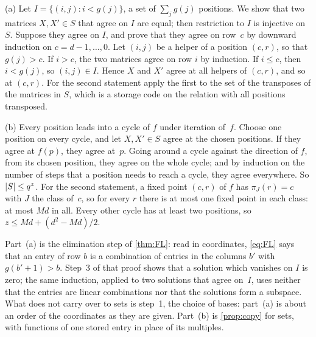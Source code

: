 \begin{informalproof}
(a) Let $I=\{(i,j):i<g(j)\}$, a set of $\sum_jg(j)$ positions. We show that two matrices $X,X'\in S$ that agree on
$I$ are equal; then restriction to $I$ is injective on $S$. Suppose they agree on $I$, and prove that they agree on
row~$c$ by downward induction on $c=d-1,\dots,0$. Let $(i,j)$ be a helper of a position $(c,r)$, so that $g(j)>c$. If
$i>c$, the two matrices agree on row $i$ by induction. If $i\le c$, then $i<g(j)$, so $(i,j)\in I$. Hence $X$ and $X'$
agree at all helpers of $(c,r)$, and so at $(c,r)$. For the second statement apply the first to the set of the
transposes of the matrices in $S$, which is a storage code on the relation with all positions transposed.

(b) Every position leads into a cycle of $f$ under iteration of~$f$. Choose one position on every cycle, and let
$X,X'\in S$ agree at the chosen positions. If they agree at $f(p)$, they agree at~$p$. Going around a cycle against
the direction of $f$, from its chosen position, they agree on the whole cycle; and by induction on the number of steps
that a position needs to reach a cycle, they agree everywhere. So $\lvert S \rvert\le q^z$. For the second statement, a fixed
point $(c,r)$ of $f$ has $\pi_J(r)=c$ with $J$ the class of~$c$, so for every $r$ there is at most one fixed point in
each class: at most $Md$ in all. Every other cycle has at least two positions, so $z\le Md+(d^2-Md)/2$.
\end{informalproof}

Part~(a) is the elimination step of \cref{thm:FL}: read in coordinates, \eqref{eq:FL} says that an entry of row $b$ is
a combination of entries in the columns $b'$ with $g(b'+1)>b$. Step~3 of that proof shows that a solution which
vanishes on $I$ is zero; the same induction, applied to two solutions that agree on~$I$, uses neither that the
entries are linear combinations nor that the solutions form a subspace. What does not carry over to sets is step~1,
the choice of bases: part~(a) is about an order of the coordinates as they are given. Part~(b) is \cref{prop:copy} for sets, with
functions of one stored entry in place of its multiples.

